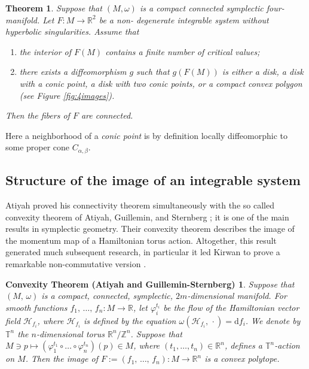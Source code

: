 \documentclass[11pt]{article}
\newtheorem{nostheorem}{Theorem}
\newtheorem*{no4theorem}{Convexity Theorem (Atiyah and Guillemin-Sternberg)}
\newcommand{\R}{{\mathbb R}}
\newcommand{\Z}{{\mathbb Z}}
\newcommand{\T}{{\mathbb T}}
\newcommand{\DD}{\mathrm{d}}
\newcommand{\RM}{\mathbb{R}}
\begin{document}
\begin{nostheorem} \label{theo:striking} Suppose that $(M, \omega)$ is
  a compact connected symplectic four-manifold. Let $F \colon M \to
  \mathbb{R}^2$ be a non- degenerate integrable system without
  hyperbolic singularities.  Assume that
  \begin{enumerate}
  \item[{\rm (a)}] the interior of $F(M)$ contains a finite number of
    critical values;
  \item[{\rm (b)}] there exists a diffeomorphism $g$ such that
    $g(F(M))$ is either a disk, a disk with a conic point, a disk with
    two conic points, or a compact convex polygon (see Figure
    \ref{fig:4images}).
  \end{enumerate}
  Then the fibers of $F$ are connected.
\end{nostheorem}

Here a neighborhood of a \emph{conic point} is by definition locally
diffeomorphic to some proper cone $C_{\alpha,\beta}$.

\subsection*{Structure of the image of an integrable system}

Atiyah proved his connectivity theorem \cite{At1982} simultaneously
with the so called convexity theorem of Atiyah, Guillemin, and
Sternberg \cite{At1982,GuSt1982}; it is one of the main results in
symplectic geometry. Their convexity theorem describes the image of
the momentum map of a Hamiltonian torus action.  Altogether, this
result generated much subsequent research, in particular it led Kirwan
to prove a remarkable non-commutative version \cite{kirwan}.


\begin{no4theorem}
  Suppose that $(M,\, \omega)$ is a compact, connected, symplectic,
  $2m$-dimensional manifold.  For smooth functions $f_1,\, \ldots,\,
  f_n\colon M \to \mathbb{R}$, let $\varphi_i^{t_i}$ be the flow of
  the Hamiltonian vector field $\mathcal{H}_{f_i}$, where
  $\mathcal{H}_{f_i}$ is defined by the equation
  $\omega(\mathcal{H}_{f_i},\, \cdot)=\DD f_i$.   We denote by $\T^n$ the
  $n$-dimensional torus $\R^n/\Z^n$. Suppose that $M\ni p
  \mapsto (\varphi_1^{t_1} \circ \ldots \circ \varphi_n^{t_n})(p) \in
  M $, where $(t_1, \ldots, t_n) \in \RM^n$, defines a $\T^n$-action
  on $M$.  Then the image of $F:=(f_1,\, \ldots,\, f_n) \colon M \to
  \mathbb{R}^n$ is a convex polytope.
\end{no4theorem}
\end{document}
